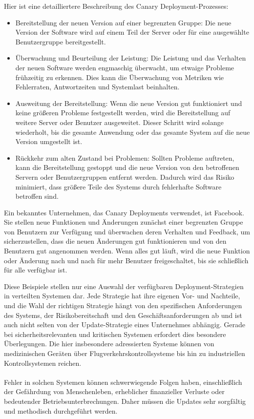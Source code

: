 \begin{itemize}
Hier ist eine detailliertere Beschreibung des Canary Deployment-Prozesses:
\begin{itemize} 
\item Bereitstellung der neuen Version auf einer begrenzten Gruppe: Die neue Version der Software wird auf einem Teil der Server oder für eine ausgewählte Benutzergruppe bereitgestellt.
\item Überwachung und Beurteilung der Leistung: Die Leistung und das Verhalten der neuen Software werden engmaschig überwacht, um etwaige Probleme frühzeitig zu erkennen. Dies kann die Überwachung von Metriken wie Fehlerraten, Antwortzeiten und Systemlast beinhalten.
\item Ausweitung der Bereitstellung: Wenn die neue Version gut funktioniert und keine größeren Probleme festgestellt werden, wird die Bereitstellung auf weitere Server oder Benutzer ausgeweitet. Dieser Schritt wird solange wiederholt, bis die gesamte Anwendung oder das gesamte System auf die neue Version umgestellt ist.
\item Rückkehr zum alten Zustand bei Problemen: Sollten Probleme auftreten, kann die Bereitstellung gestoppt und die neue Version von den betroffenen Servern oder Benutzergruppen entfernt werden. Dadurch wird das Risiko minimiert, dass größere Teile des Systems durch fehlerhafte Software betroffen sind.
\end{itemize} 
Ein bekanntes Unternehmen, das Canary Deployments verwendet, ist Facebook. Sie stellen neue Funktionen und Änderungen zunächst einer begrenzten Gruppe von Benutzern zur Verfügung und überwachen deren Verhalten und Feedback, um sicherzustellen, dass die neuen Änderungen gut funktionieren und von den Benutzern gut angenommen werden. Wenn alles gut läuft, wird die neue Funktion oder Änderung nach und nach für mehr Benutzer freigeschaltet, bis sie schließlich für alle verfügbar ist.
\end{itemize} 
Diese Beispiele stellen nur eine Auswahl der verfügbaren Deployment-Strategien in verteilten Systemen dar. Jede Strategie hat ihre eigenen Vor- und Nachteile, und die Wahl der richtigen Strategie hängt von den spezifischen Anforderungen des Systems, der Risikobereitschaft und den Geschäftsanforderungen ab und ist auch nicht selten von der Update-Strategie eines Unternehmes abhängig. Gerade bei sicherheitsrelevanten und kritischen Systemen erfordert dies besondere Überlegungen. 
Die hier insbesondere adressierten Systeme können von medizinischen Geräten über Flugverkehrskontrollsysteme bis hin zu industriellen Kontrollsystemen reichen. 
\\\\
Fehler in solchen Systemen können schwerwiegende Folgen haben, einschließlich der Gefährdung von Menschenleben, erheblicher finanzieller Verluste oder bedeutender Betriebsunterbrechungen. Daher müssen die Updates sehr sorgfältig und methodisch durchgeführt werden.

